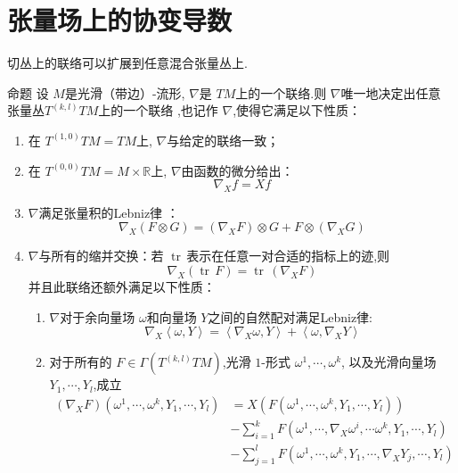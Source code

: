 \documentclass[../../几何与拓扑.tex]{subfiles}
\begin{document}
\section{张量场上的协变导数}

切丛上的联络可以扩展到任意混合张量丛上.

\begin{proposition}{命题}\label{张量场上的协变导数}
    设 \(  M  \)是光滑（带边）-流形, \(   \nabla   \)是 \(  TM  \)上的一个联络.则 \(   \nabla   \)唯一地决定出任意 张量丛\(  T^{\left( k,l \right) }TM  \)上的一个联络     ,也记作 \(   \nabla   \),使得它满足以下性质：
    \begin{enumerate}
        \item 在 \(  T^{\left( 1,0 \right) }TM =  TM  \)上, \(   \nabla   \)与给定的联络一致；
        \item 在 \(  T^{\left( 0,0 \right) }TM =  M\times \mathbb{R}   \)上, \(   \nabla   \)由函数的微分给出： \[
         \nabla _{X}f =  Xf
        \]    
        \item \(   \nabla   \)满足张量积的Lebniz律 ：  \[
         \nabla _{X} \left( F\otimes G \right) =  \left(  \nabla _{X}F \right)\otimes G+ F\otimes \left(  \nabla _{X}G \right)   
        \]
        \item \(   \nabla   \)与所有的缩并交换：若 \(  \operatorname{tr}\,  \)表示在任意一对合适的指标上的迹,则 \[
         \nabla _{X} \left( \operatorname{tr}\,F \right) =  \operatorname{tr}\,\left(  \nabla _{X}F \right)  
        \]并且此联络还额外满足以下性质：
        \begin{enumerate}
            \item  \(   \nabla   \)对于余向量场 \(   \omega   \)和向量场 \(  Y  \)之间的自然配对满足Lebniz律: \[
             \nabla _{X} \left< \omega ,Y \right> =  \left< \nabla _{X} \omega ,Y \right> +  \left< \omega , \nabla _{X}Y \right>
            \]   
            \item 对于所有的 \(  F \in  \Gamma \left( T^{\left( k,l \right)} TM \right)   \),光滑 \(  1  \)-形式 \(   \omega^1,\cdots,\omega^k   \), 以及光滑向量场 \(   Y_1,\cdots,Y_l   \),成立 \[
            \begin{aligned}
            \left(  \nabla _{X}F \right)\left(  \omega^1,\cdots,\omega^k , Y_1,\cdots,Y_l  \right)& =  X \left( F\left(  \omega^1,\cdots,\omega^k , Y_1,\cdots,Y_l  \right)  \right)\\ 
             &- \sum _{i= 1}^{k} F\left(  \omega ^{1},\cdots , \nabla _{X} \omega ^{i},\cdots  \omega ^{k}, Y_1,\cdots,Y_l  \right)     \\ 
              & - \sum _{j= 1}^{l} F\left(  \omega^1,\cdots,\omega^k , Y_1,\cdots , \nabla _{X}Y_{j},\cdots ,Y_{l} \right) 
            \end{aligned}
            \]   
        \end{enumerate}
           
    \end{enumerate}
     
\end{proposition}
\end{document}
